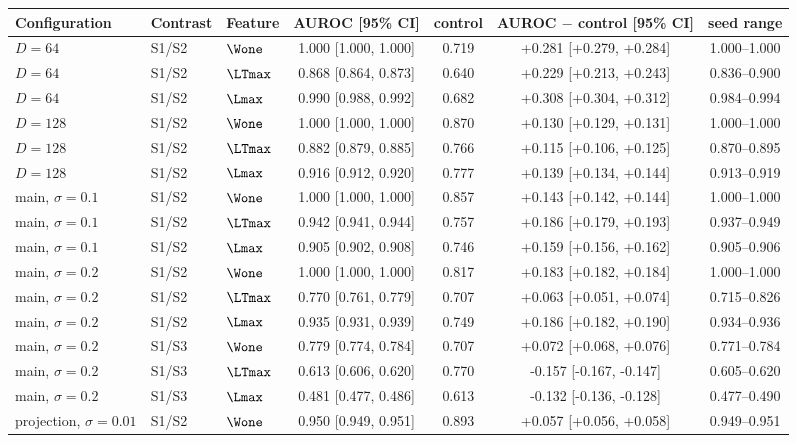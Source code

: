 \begin{table}[p]
\centering
\scriptsize
\begin{tabular}{lllcccc}
\toprule
Configuration & Contrast & Feature & AUROC [95\% CI] & control & AUROC $-$ control [95\% CI] & seed range \\
\midrule
$D{=}64$ & S1/S2 & $\Wone$ & 1.000 [1.000, 1.000] & 0.719 & +0.281 [+0.279, +0.284] & 1.000--1.000 \\
$D{=}64$ & S1/S2 & $\LTmax$ & 0.868 [0.864, 0.873] & 0.640 & +0.229 [+0.213, +0.243] & 0.836--0.900 \\
$D{=}64$ & S1/S2 & $\Lmax$ & 0.990 [0.988, 0.992] & 0.682 & +0.308 [+0.304, +0.312] & 0.984--0.994 \\
$D{=}128$ & S1/S2 & $\Wone$ & 1.000 [1.000, 1.000] & 0.870 & +0.130 [+0.129, +0.131] & 1.000--1.000 \\
$D{=}128$ & S1/S2 & $\LTmax$ & 0.882 [0.879, 0.885] & 0.766 & +0.115 [+0.106, +0.125] & 0.870--0.895 \\
$D{=}128$ & S1/S2 & $\Lmax$ & 0.916 [0.912, 0.920] & 0.777 & +0.139 [+0.134, +0.144] & 0.913--0.919 \\
main, $\sigma{=}0.1$ & S1/S2 & $\Wone$ & 1.000 [1.000, 1.000] & 0.857 & +0.143 [+0.142, +0.144] & 1.000--1.000 \\
main, $\sigma{=}0.1$ & S1/S2 & $\LTmax$ & 0.942 [0.941, 0.944] & 0.757 & +0.186 [+0.179, +0.193] & 0.937--0.949 \\
main, $\sigma{=}0.1$ & S1/S2 & $\Lmax$ & 0.905 [0.902, 0.908] & 0.746 & +0.159 [+0.156, +0.162] & 0.905--0.906 \\
main, $\sigma{=}0.2$ & S1/S2 & $\Wone$ & 1.000 [1.000, 1.000] & 0.817 & +0.183 [+0.182, +0.184] & 1.000--1.000 \\
main, $\sigma{=}0.2$ & S1/S2 & $\LTmax$ & 0.770 [0.761, 0.779] & 0.707 & +0.063 [+0.051, +0.074] & 0.715--0.826 \\
main, $\sigma{=}0.2$ & S1/S2 & $\Lmax$ & 0.935 [0.931, 0.939] & 0.749 & +0.186 [+0.182, +0.190] & 0.934--0.936 \\
main, $\sigma{=}0.2$ & S1/S3 & $\Wone$ & 0.779 [0.774, 0.784] & 0.707 & +0.072 [+0.068, +0.076] & 0.771--0.784 \\
main, $\sigma{=}0.2$ & S1/S3 & $\LTmax$ & 0.613 [0.606, 0.620] & 0.770 & -0.157 [-0.167, -0.147] & 0.605--0.620 \\
main, $\sigma{=}0.2$ & S1/S3 & $\Lmax$ & 0.481 [0.477, 0.486] & 0.613 & -0.132 [-0.136, -0.128] & 0.477--0.490 \\
projection, $\sigma{=}0.01$ & S1/S2 & $\Wone$ & 0.950 [0.949, 0.951] & 0.893 & +0.057 [+0.056, +0.058] & 0.949--0.951 \\

\end{tabular}
\end{table}
